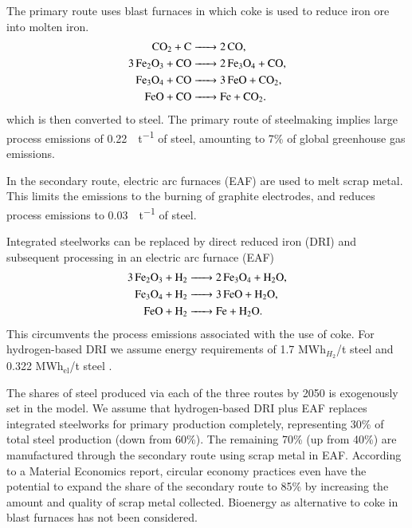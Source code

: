 The primary route uses blast furnaces in which coke is used to reduce iron ore
into molten iron.
\begin{align}
    \ce{CO2 + C &-> 2CO}, \\
    \ce{3Fe2O3 + CO &-> 2Fe3O4 + CO}, \\
    \ce{Fe3O4 + CO &-> 3FeO + CO2}, \\
    \ce{FeO + CO &-> Fe + CO2}.
\end{align}
which is then converted to steel. The primary route of steelmaking implies large
process emissions of \SI{0.22}{\tco\per\tonne} of steel, amounting to 7\% of
global greenhouse gas emissions.

In the secondary route, electric arc furnaces (EAF) are used to melt scrap
metal. This limits the \co emissions to the burning of graphite electrodes,
 and reduces process emissions to
\SI{0.03}{\tco\per\tonne} of steel.

Integrated steelworks can be replaced by direct reduced iron (DRI) and subsequent processing in an electric arc furnace (EAF)
\begin{align}
    \ce{3Fe2O3 + H2 &-> 2Fe3O4 + H2O}, \\
    \ce{Fe3O4 + H2 &-> 3FeO + H2O}, \\
    \ce{FeO + H2 &-> Fe + H2O}.
\end{align}
This circumvents the process emissions associated with the use of coke. For
hydrogen-based DRI we assume energy requirements of 1.7 MWh$_{H_2}$/t steel
 and 0.322 MWh$_{\text{el}}$/t steel
.

The shares of steel produced via each of the three routes by 2050 is exogenously
set in the model. We assume that hydrogen-based DRI plus EAF replaces integrated
steelworks for primary production completely, representing 30\% of total steel
production (down from 60\%). The remaining 70\% (up from 40\%) are manufactured
through the secondary route using scrap metal in EAF. According to
a Material Economics report, circular economy practices even have the potential to
expand the share of the secondary route to 85\% by increasing the amount and
quality of scrap metal collected. Bioenergy as alternative to coke in blast
furnaces has not been considered.

